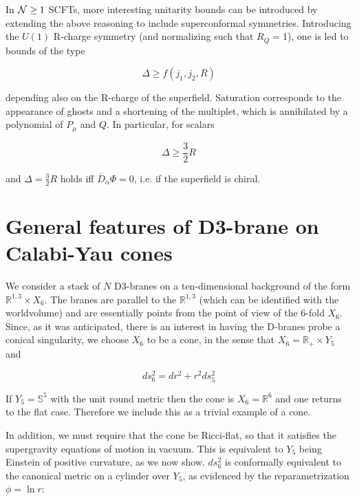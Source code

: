 In $\mathcal{N} \geq 1$ SCFTs, more interesting unitarity bounds can be introduced by extending the above reasoning to include superconformal symmetries. Introducing the $U(1)$ R-charge symmetry (and normalizing such that $R_Q = 1$), one is led to bounds of the type

\begin{equation}
	\Delta \geq f(j_1,j_2,R)
	\label{}
\end{equation}

depending also on the R-charge of the superfield. Saturation corresponds to the appearance of ghosts and a shortening of the multiplet, which is annihilated by a polynomial of $P_\mu$ and $Q$. In particular, for scalars

\begin{equation}
	\Delta \geq \frac{3}{2} R
	\label{}
\end{equation}

and $\Delta = \frac{3}{2} R \label{deltarcharge}$ holds iff $\overline D_\alpha \Phi = 0$, i.e. if the superfield is chiral.

\section{General features of D3-brane on Calabi-Yau cones}

We consider a stack of $N$ D3-branes on a ten-dimensional background of the form $\mathbb{R}^{1,3} \times X_6$. The branes are parallel to the $\mathbb{R}^{1,3}$ (which can be identified with the worldvolume) and are essentially points from the point of view of the 6-fold $X_6$. Since, as it was anticipated, there is an interest in having the D-branes probe a conical singularity, we choose $X_6$ to be a cone, in the sense that $X_6 = \mathbb{R}_+ \times Y_5$ and

\begin{equation}
	ds_6^2 = dr^2 + r^2 ds_5^2
	\label{}
\end{equation}

If $Y_5 = \mathbb{S}^5$ with the unit round metric then the cone is $X_6 = \mathbb{R}^6$ and one returns to the flat case. Therefore we include this as a trivial example of a cone.

In addition, we must require that the cone be Ricci-flat, so that it satisfies the supergravity equations of motion in vacuum. This is equivalent to $Y_5$ being Einstein of positive curvature, as we now show. $ds_6^2$ is conformally equivalent to the canonical metric on a cylinder over $Y_5$, as evidenced by the reparametrization $\phi = \ln r$:

